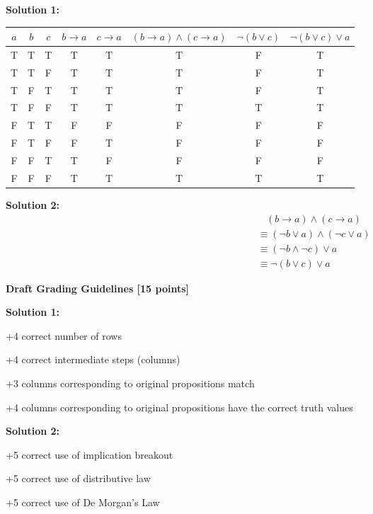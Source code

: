 \documentclass[12pt]{exam}
\begin{document}
\begin{solution}
\textbf{Solution 1:}
\begin{center}
\begin{tabular}{c|c|c|c|c|c|c|c}
$a$ & $b$ & $c$ & $b \rightarrow a$ & $c \rightarrow a$ & $(b \rightarrow a) \land (c \rightarrow a)$ & $\neg(b \lor c)$ & $\neg(b \lor c) \lor a$ \\ 
\hline
T & T & T & T & T & T & F & T\\
T & T & F & T & T & T & F & T\\
T & F & T & T & T & T & F & T\\
T & F & F & T & T & T & T & T\\
F & T & T & F & F & F & F & F\\
F & T & F & F & T & F & F & F\\
F & F & T & T & F & F & F & F\\
F & F & F & T & T & T & T & T
\end{tabular}
\end{center}

\textbf{Solution 2:}
\begin{align*}
    &\ \ \ \ (b \rightarrow a) \land (c \rightarrow a) \tag{Premise} \\
    &\equiv (\neg b \lor a) \land (\neg c \lor a) \tag{Implication Breakout} \\
    &\equiv (\neg b \land \neg c) \lor a \tag{Distributive Law} \\
    &\equiv \neg(b \lor c) \lor a \tag{De Morgan's Law}
\end{align*}


\textbf{Draft Grading Guidelines [15 points]}

\textbf{Solution 1:}
\begin{guidelines}
    \item +4 correct number of rows
    \item +4 correct intermediate steps (columns)
    \item +3 columns corresponding to original propositions match
    \item +4 columns corresponding to original propositions have the correct truth values
\end{guidelines}
\textbf{Solution 2:}
\begin{guidelines}
    \item +5 correct use of implication breakout
    \item +5 correct use of distributive law
    \item +5 correct use of De Morgan's Law
\end{guidelines}
\end{solution}
\end{document}
